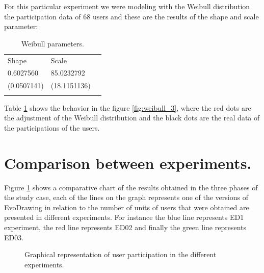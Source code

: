 For this particular experiment we were modeling with the Weibull distribution
\cite{weibull1951wide} the participation data of 68 users and these are the
results of the shape and scale parameter:

\begin{table}
\small
\caption{Weibull parameters.}
\label{tab:weibullp_3}
\centering
\small
\begin{tabular}{p{3cm} p{3cm} p{3cm} }
\hline\noalign{\smallskip}
Shape  & Scale &  \\
\noalign{\smallskip}\hline\noalign{\smallskip}
\small{0.6027560} & \small{85.0232792} & \\ \hline
\small{(0.0507141)} & \small{(18.1151136)} & \\ \hline

\noalign{\smallskip}\hline
\end{tabular}
\end{table}

Table \ref{tab:weibullp_3} shows the behavior in the figure
\ref{fig:weibull_3}, where the red dots are the adjustment of the Weibull
distribution and the black dots are the real data of the participations of the
users.



\section{Comparison between experiments.}
Figure \ref{fig:comparison} shows a comparative chart of the results obtained
in the three phases of the study case, each of the lines on the graph represents
one of the versions of EvoDrawing in relation to the number of units of users
that were obtained are presented in different experiments. For instance the blue
line represents ED1 experiment, the red line represents ED02
and finally the green line represents ED03.


\begin{figure}
\centering
{} %
\caption{Graphical representation of user participation in the different experiments.}
\label{fig:comparison}
\end{figure}
